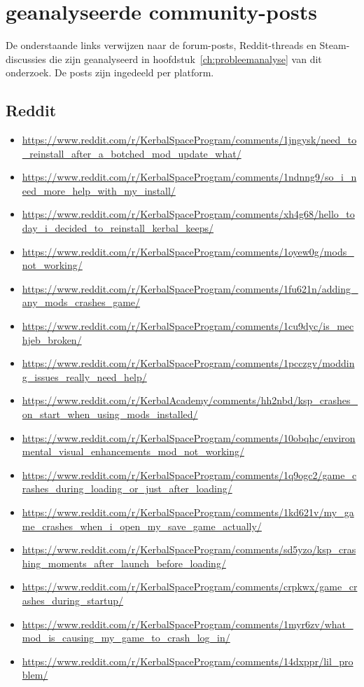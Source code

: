 \chapter{geanalyseerde community-posts}
\label{app:corpus}

De onderstaande links verwijzen naar de forum-posts, Reddit-threads en Steam-discussies die zijn geanalyseerd in hoofdstuk~\ref{ch:probleemanalyse} van dit onderzoek. De posts zijn ingedeeld per platform.

\section{Reddit}

\begin{itemize}
  \item \url{https://www.reddit.com/r/KerbalSpaceProgram/comments/1jngysk/need_to_reinstall_after_a_botched_mod_update_what/}
  \item \url{https://www.reddit.com/r/KerbalSpaceProgram/comments/1ndnng9/so_i_need_more_help_with_my_install/}
  \item \url{https://www.reddit.com/r/KerbalSpaceProgram/comments/xh4g68/hello_today_i_decided_to_reinstall_kerbal_keeps/}
  \item \url{https://www.reddit.com/r/KerbalSpaceProgram/comments/1oyew0g/mods_not_working/}
  \item \url{https://www.reddit.com/r/KerbalSpaceProgram/comments/1fu621n/adding_any_mods_crashes_game/}
  \item \url{https://www.reddit.com/r/KerbalSpaceProgram/comments/1cu9dyc/is_mechjeb_broken/}
  \item \url{https://www.reddit.com/r/KerbalSpaceProgram/comments/1pcczgv/modding_issues_really_need_help/}
  \item \url{https://www.reddit.com/r/KerbalAcademy/comments/hh2nbd/ksp_crashes_on_start_when_using_mods_installed/}
  \item \url{https://www.reddit.com/r/KerbalSpaceProgram/comments/10obqhc/environmental_visual_enhancements_mod_not_working/}
  \item \url{https://www.reddit.com/r/KerbalSpaceProgram/comments/1q9ogc2/game_crashes_during_loading_or_just_after_loading/}
  \item \url{https://www.reddit.com/r/KerbalSpaceProgram/comments/1kd621v/my_game_crashes_when_i_open_my_save_game_actually/}
  \item \url{https://www.reddit.com/r/KerbalSpaceProgram/comments/sd5yzo/ksp_crashing_moments_after_launch_before_loading/}
  \item \url{https://www.reddit.com/r/KerbalSpaceProgram/comments/crpkwx/game_crashes_during_startup/}
  \item \url{https://www.reddit.com/r/KerbalSpaceProgram/comments/1myr6zv/what_mod_is_causing_my_game_to_crash_log_in/}
  \item \url{https://www.reddit.com/r/KerbalSpaceProgram/comments/14dxppr/lil_problem/}
\end{itemize}


